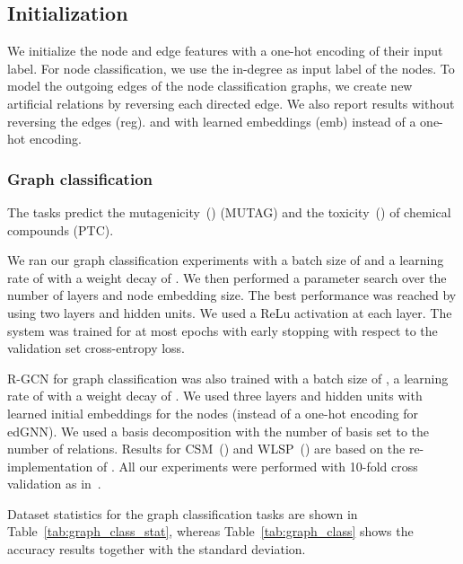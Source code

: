 \documentclass{article} \usepackage{iclr2019_conference,times}
\begin{document}
\subsection{Initialization}

We initialize the node and edge features with a one-hot encoding of their input label. For node classification, we use the in-degree as input label of the nodes. To model the outgoing edges of the node classification graphs, we create new artificial relations by reversing each directed edge. We also report results without reversing the edges (reg). and with learned embeddings (emb) instead of a one-hot encoding.

\subsubsection{Graph classification}

The tasks  predict the mutagenicity~(\cite{Debnath1991,Kriege2012}) (MUTAG) and the toxicity~(\cite{Helma2001}) of chemical compounds (PTC).

We ran our graph classification experiments with a batch size of  and a learning rate of  with a weight decay of . We then performed a parameter search over the number of layers and node embedding size. The best performance was reached by using two layers and  hidden units. We used a ReLu activation at each layer. The system was trained for at most  epochs with early stopping with respect to the validation set cross-entropy loss. 

R-GCN for graph classification was also trained with a batch size of , a learning rate of  with a weight decay of . We used three layers and  hidden units with learned initial embeddings for the nodes (instead of a one-hot encoding for edGNN).
We used a basis decomposition with the number of basis set to the number of relations. Results for CSM~(\cite{Kriege2012}) and WLSP~(\cite{Shervashidze2011}) are based on the re-implementation of \cite{Kriege2012}. All our experiments were performed with 10-fold cross validation as in~\cite{Kriege2012}. 

Dataset statistics for the graph classification tasks are shown in Table~\ref{tab:graph_class_stat}, whereas Table~\ref{tab:graph_class} shows the accuracy results together with the standard deviation. 
\end{document}
